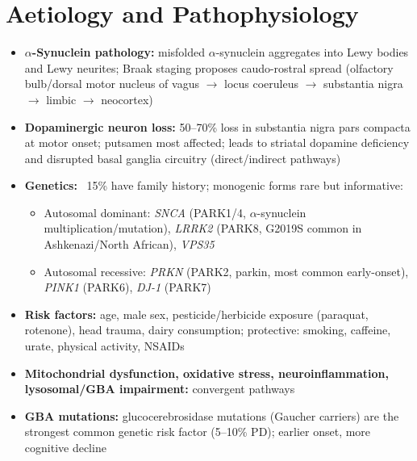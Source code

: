 \section*{Aetiology and Pathophysiology}
\begin{itemize}
    \item \textbf{$\alpha$-Synuclein pathology:} misfolded $\alpha$-synuclein aggregates into Lewy bodies and Lewy neurites; Braak staging proposes caudo-rostral spread (olfactory bulb/dorsal motor nucleus of vagus $\to$ locus coeruleus $\to$ substantia nigra $\to$ limbic $\to$ neocortex)
    \item \textbf{Dopaminergic neuron loss:} 50--70\% loss in substantia nigra pars compacta at motor onset; putsamen most affected; leads to striatal dopamine deficiency and disrupted basal ganglia circuitry (direct/indirect pathways)
    \item \textbf{Genetics:} ~15\% have family history; monogenic forms rare but informative:
    \begin{itemize}
        \item Autosomal dominant: \textit{SNCA} (PARK1/4, $\alpha$-synuclein multiplication/mutation), \textit{LRRK2} (PARK8, G2019S common in Ashkenazi/North African), \textit{VPS35}
        \item Autosomal recessive: \textit{PRKN} (PARK2, parkin, most common early-onset), \textit{PINK1} (PARK6), \textit{DJ-1} (PARK7)
    \end{itemize}
    \item \textbf{Risk factors:} age, male sex, pesticide/herbicide exposure (paraquat, rotenone), head trauma, dairy consumption; protective: smoking, caffeine, urate, physical activity, NSAIDs
    \item \textbf{Mitochondrial dysfunction, oxidative stress, neuroinflammation, lysosomal/GBA impairment:} convergent pathways
    \item \textbf{GBA mutations:} glucocerebrosidase mutations (Gaucher carriers) are the strongest common genetic risk factor (5--10\% PD); earlier onset, more cognitive decline
\end{itemize}

